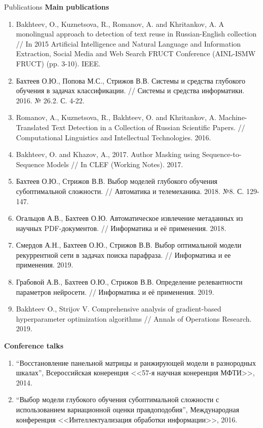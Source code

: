 \documentclass[usenames,dvipsnames,11pt,pdf,utf8,russian,aspectratio=43]{beamer}
\begin{document}
\begin{frame}{Publications}
\tiny
\textbf{Main publications}
\begin{enumerate}
\item Bakhteev, O., Kuznetsova, R., Romanov, A. and Khritankov, A. A monolingual approach to detection of text reuse in Russian-English collection // In 2015 Artificial Intelligence and Natural Language and Information Extraction, Social Media and Web Search FRUCT Conference (AINL-ISMW FRUCT) (pp. 3-10). IEEE.

\item Бахтеев О.Ю., Попова М.С., Стрижов В.В. Системы и средства глубокого обучения в задачах классификации. // Системы и средства информатики. 2016. № 26.2. С. 4-22.
\item Romanov, A., Kuznetsova, R., Bakhteev, O. and Khritankov, A. Machine-Translated Text Detection in a Collection of Russian Scientific Papers. // Computational Linguistics and Intellectual Technologies. 2016. 
\item Bakhteev, O. and Khazov, A., 2017. Author Masking using Sequence-to-Sequence Models // In CLEF (Working Notes). 2017.
\item Бахтеев О.Ю., Стрижов В.В. Выбор моделей глубокого обучения субоптимальной сложности. // Автоматика и телемеханика. 2018. №8. С. 129-147.
\item Огальцов А.В., Бахтеев О.Ю. Автоматическое извлечение метаданных из научных PDF-документов. // Информатика и её применения. 2018.
\item Смердов А.Н., Бахтеев О.Ю., Стрижов В.В. Выбор оптимальной модели рекуррентной сети в задачах поиска парафраза. // Информатика и ее применения. 2019.
\item Грабовой А.В., Бахтеев О.Ю., Стрижов В.В. Определение релевантности параметров нейросети. // Информатика и её применения. 2019.
\item Bakhteev O., Strijov V. Comprehensive analysis of gradient-based hyperparameter optimization algorithms // Annals of Operations Research. 2019.
\end{enumerate}
\textbf{Conference talks}
\begin{enumerate}
\item ``Восстановление панельной матрицы и ранжирующей модели в разнородных шкалах'', Всероссийская конеренция <<57-я научная конеренция МФТИ>>, 2014.
\item ``Выбор модели глубокого обучения субоптимальной сложности с использованием вариационной оценки правдоподобия'', Международная конференция <<Интеллектуализация обработки информации>>, 2016.

\end{enumerate}
\end{frame}
\end{document}
